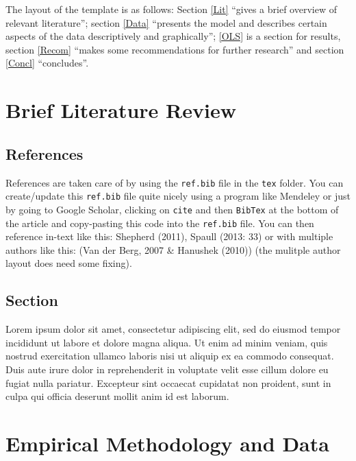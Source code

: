 \documentclass[12pt,preprint, authoryear]{article}
\numberwithin{equation}{section}
\numberwithin{figure}{section}
\numberwithin{table}{section}
\begin{document}
The layout of the template is as follows: Section \ref{Lit} ``gives a
brief overview of relevant literature''; section \ref{Data} ``presents
the model and describes certain aspects of the data descriptively and
graphically''; \ref{OLS} is a section for results, section \ref{Recom}
``makes some recommendations for further research'' and section
\ref{Concl} ``concludes''.

\section{\texorpdfstring{Brief Literature Review
\label{Lit}}{Brief Literature Review }}\label{brief-literature-review}

\subsection{References}\label{references}

References are taken care of by using the \texttt{ref.bib} file in the
\texttt{tex} folder. You can create/update this \texttt{ref.bib} file
quite nicely using a program like Mendeley or just by going to Google
Scholar, clicking on \texttt{cite} and then \texttt{BibTex} at the
bottom of the article and copy-pasting this code into the
\texttt{ref.bib} file. You can then reference in-text like this:
Shepherd (2011), Spaull (2013: 33) or with multiple authors like this:
(Van der Berg, 2007 \& Hanushek (2010)) (the mulitple author layout does
need some fixing).

\subsection{Section}\label{section}

Lorem ipsum dolor sit amet, consectetur adipiscing elit, sed do eiusmod
tempor incididunt ut labore et dolore magna aliqua. Ut enim ad minim
veniam, quis nostrud exercitation ullamco laboris nisi ut aliquip ex ea
commodo consequat. Duis aute irure dolor in reprehenderit in voluptate
velit esse cillum dolore eu fugiat nulla pariatur. Excepteur sint
occaecat cupidatat non proident, sunt in culpa qui officia deserunt
mollit anim id est laborum.

\section{\texorpdfstring{Empirical Methodology and Data
\label{Data}}{Empirical Methodology and Data }}\label{empirical-methodology-and-data}
\end{document}
